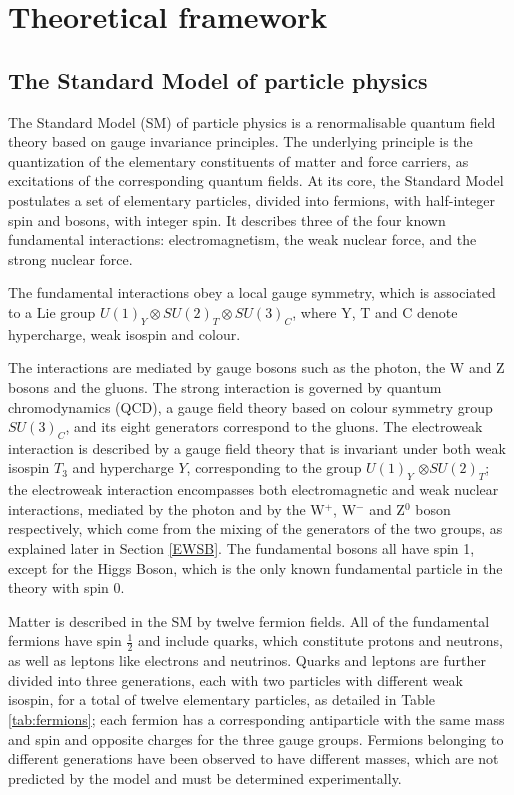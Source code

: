 \chapter{Theoretical framework}
\section{The Standard Model of particle physics}
The Standard Model (SM) of particle physics is a renormalisable quantum field theory based on gauge invariance principles.
The underlying principle is the quantization of the elementary constituents of matter and force carriers,
as excitations of the corresponding quantum fields.
At its core, the Standard Model postulates a set of elementary particles, divided into fermions, with half-integer spin and bosons, with integer spin.
It describes three of the four known fundamental interactions: electromagnetism, the weak nuclear force, and the strong nuclear force.

The fundamental interactions obey a local gauge symmetry, which is associated to a Lie group $U(1)_Y \otimes SU(2)_T \otimes SU(3)_C$, where Y, T and C denote hypercharge, weak isospin and colour.

The interactions are mediated by gauge bosons such as the photon, the W and Z bosons and the gluons.
The strong interaction is governed by quantum chromodynamics (QCD), a gauge field theory based on colour symmetry group $SU(3)_C$,
and its eight generators correspond to the gluons.
The electroweak interaction is described by a gauge field theory that is invariant under both weak isospin $T_3$ and hypercharge $Y$,
corresponding to the group $U(1)_Y$ $\otimes SU(2)_T$;
the electroweak interaction encompasses both electromagnetic and weak nuclear interactions,
mediated by the photon and by the W$^+$, W$^-$ and Z$^0$ boson respectively,
which come from the mixing of the generators of the two groups, as explained later in Section \ref{EWSB}.
The fundamental bosons all have spin 1, except for the Higgs Boson, which is the only known fundamental particle in the theory with spin 0.

Matter is described in the SM by twelve fermion fields.
All of the fundamental fermions have spin $\frac{1}{2}$ and include quarks, which constitute protons and neutrons, as well as leptons like electrons and neutrinos.
Quarks and leptons are further divided into three generations, each with two particles with different weak isospin, for a total of twelve elementary particles, as detailed in Table \ref{tab:fermions}; each fermion has a corresponding antiparticle with the same mass and spin and opposite charges for the three gauge groups.
Fermions belonging to different generations have been observed to have different masses, which are not predicted by the model and must be determined experimentally.

